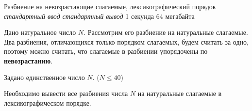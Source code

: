 \begin{problem}%
{Разбиение на невозрастающие слагаемые, лексикографический порядок}%
{\textsl{стандартный ввод}}%
{\textsl{стандартный вывод}}%
{1 секунда}%
{64 мегабайта}{}

Дано натуральное число $N$. Рассмотрим его разбиение на натуральные слагаемые. Два разбиения, отличающихся только порядком слагаемых, будем считать за одно, поэтому можно считать, что слагаемые в разбиении упорядочены по \textbf{невозрастанию}.

\InputFile

Задано единственное число $N$. ($N \le 40$)

\OutputFile

Необходимо вывести все разбиения числа $N$ на натуральные слагаемые в лексикографическом порядке.

\Examples

\begin{example}
%
\end{example}
\end{problem}